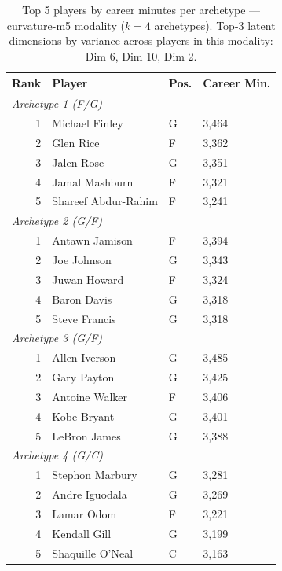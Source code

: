 \begin{table}[htbp]
  \centering\small
  \begin{tabular}{rlll}
    \toprule
    Rank & Player & Pos. & Career Min. \\
    \midrule
    \multicolumn{4}{l}{\textit{Archetype 1 (F/G)}} \\
    \midrule
    1 & Michael Finley & G & 3,464 \\
    2 & Glen Rice & F & 3,362 \\
    3 & Jalen Rose & G & 3,351 \\
    4 & Jamal Mashburn & F & 3,321 \\
    5 & Shareef Abdur-Rahim & F & 3,241 \\
    \midrule[0.4pt]
    \multicolumn{4}{l}{\textit{Archetype 2 (G/F)}} \\
    \midrule
    1 & Antawn Jamison & F & 3,394 \\
    2 & Joe Johnson & G & 3,343 \\
    3 & Juwan Howard & F & 3,324 \\
    4 & Baron Davis & G & 3,318 \\
    5 & Steve Francis & G & 3,318 \\
    \midrule[0.4pt]
    \multicolumn{4}{l}{\textit{Archetype 3 (G/F)}} \\
    \midrule
    1 & Allen Iverson & G & 3,485 \\
    2 & Gary Payton & G & 3,425 \\
    3 & Antoine Walker & F & 3,406 \\
    4 & Kobe Bryant & G & 3,401 \\
    5 & LeBron James & G & 3,388 \\
    \midrule[0.4pt]
    \multicolumn{4}{l}{\textit{Archetype 4 (G/C)}} \\
    \midrule
    1 & Stephon Marbury & G & 3,281 \\
    2 & Andre Iguodala & G & 3,269 \\
    3 & Lamar Odom & F & 3,221 \\
    4 & Kendall Gill & G & 3,199 \\
    5 & Shaquille O'Neal & C & 3,163 \\
    \bottomrule
  \end{tabular}
  \caption{Top 5 players by career minutes per archetype --- curvature-m5 modality ($k=4$ archetypes). Top-3 latent dimensions by variance across players in this modality: Dim 6, Dim 10, Dim 2.}
  \label{tab:arch_reps_curvature_m5}
\end{table}

